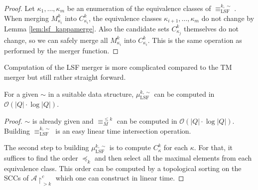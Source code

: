 \begin{proof}
	Let $\kappa_1, \dots, \kappa_m$ be an enumeration of the equivalence classes of $\equiv_\text{LSF}^{k,\sim}$. When merging $M_{\kappa_i}^k$ into $C_{\kappa_i}^k$, the equivalence classes $\kappa_{i+1}, \dots, \kappa_m$ do not change by Lemma \ref{lem:lsf_kappamerge}. Also the candidate sets $C_{\kappa_j}^k$ themselves do not change, so we can safely merge all $M_{\kappa_i}^k$ into $C_{\kappa_i}^k$. This is the same operation as performed by the merger function.
\end{proof}

Computation of the LSF merger is more complicated compared to the TM merger but still rather straight forward.

\begin{theorem}
	For a given $\sim$ in a suitable data structure, $\mu_\text{LSF}^{k,\sim}$ can be computed in $\mathcal{O}(|Q| \cdot \log |Q|)$.
\end{theorem}

\begin{proof}
	$\sim$ is already given and $\equiv_M^{\leq k}$ can be computed in $\mathcal{O}(|Q| \cdot \log |Q|)$. Building $\equiv_\text{LSF}^{k,\sim}$ is an easy linear time intersection operation.
	
	The second step to building $\mu_\text{LSF}^{k,\sim}$ is to compute $C_\kappa^k$ for each $\kappa$. For that, it suffices to find the order $\preceq_k$ and then select all the maximal elements from each equivalence class. This order can be computed by a topological sorting on the SCCs of $\mathcal{A} \upharpoonright^c_{> k}$ which one can construct in linear time.
\end{proof}
